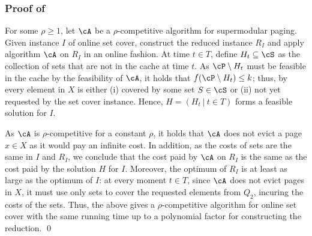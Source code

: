 \subsubsection*{Proof of }

For some $\rho \geq 1$,	let $\cA$ be a $\rho$-competitive algorithm for \textnormal{supermodular paging}. Given instance $I$ of online set cover, construct the reduced instance $R_I$ and apply algorithm $\cA$ on $R_I$ in an online fashion. At time $t \in T$, define $H_t \subseteq \cS$ as the collection of sets that are not in the cache at time $t$. As $\cP \setminus H_t$ must be feasible in the cache by the feasibility of $\cA$, it holds that $f(\cP \setminus H_t) \leq k$; thus, by  every element in $X$ is either (i) covered by some set $S \in \cS$ or (ii) not yet requested by the set cover instance. Hence, $H = (H_t~|~t \in T)$ forms a feasible solution for $I$.  
	
	As $\cA$ is $\rho$-competitive for a constant $\rho$, it holds that $\cA$ does not evict a page $x \in X$ as it would pay an infinite cost. In addition, as the costs of sets are the same in $I$ and $R_I$, we conclude that the cost paid by $\cA$ on $R_I$ is the same as the cost paid by the solution $H$ for $I$. Moreover, the optimum of $R_I$ is at least as large as the optimum of $I$: at every moment $t \in T$, since $\cA$ does not evict pages in $X$, it must use only sets to cover the requested elements from $Q_2$, incuring the costs of the sets.  Thus, the above gives a $\rho$-competitive algorithm for online set cover with the same running time up to a polynomial factor for constructing the reduction. \qed




